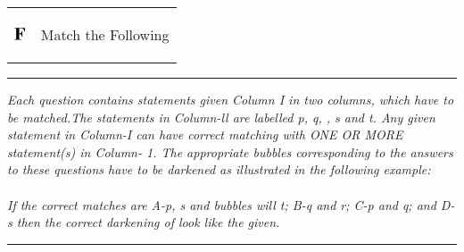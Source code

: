\documentclass[journal,12pt,twocolumn]{IEEEtran}
\theoremstyle{remark}
\begin{document}
\newpage
\onecolumn
\begin{tabular}{p{1.5cm}p{10cm}}
   $\Large \textbf{F} $  &   \begin{Large}
   Match the Following 
   \end{Large}   
\end{tabular}
\noindent
\rule{1\textwidth}{1pt} %

\noindent
\begin{minipage}[t]{0.69\textwidth} 
    \textit{Each question contains statements given Column I in two columns, which have to be matched.The statements in Column-ll are labelled p, q, , s and t. Any given statement in Column-I can have correct matching with ONE OR MORE statement(s) in Column- 1. The appropriate bubbles corresponding to the answers to these questions have to be darkened as illustrated in the following example: }\\ \\
    \textit{If the correct matches are A-p, s and
bubbles will
t; B-q and r; C-p and q; and D-s then the correct darkening of look like the given.} 

    
\end{minipage}
\hfill
\begin{minipage}[t]{0.3\textwidth} 
    
\end{minipage}
\noindent
\rule{1\textwidth}{1pt} %
\end{document}
